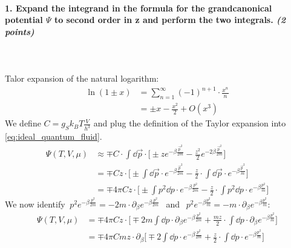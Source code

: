 \paragraph{1. Expand the integrand in the formula for the 
    grandcanonical potential $\Psi$ to second order in z 
    and perform the two integrals. \textit{(2 points)}
} \ \\
    \\
    Talor expansion of the natural logarithm:
    \begin{align}
        \ln(1\pm x)
        &=\sum_{n=1}^\infty(-1)^{n+1}\cdot\frac{x^n}{n} \\
        &=\pm x-\frac{x^2}{2}+O(x^3) 
    \end{align}
    We define $C=g_Sk_BT\frac{V}{h^3}$ and plug the 
    definition of the Taylor expansion into 
    \autoref{eq:ideal_quantum_fluid}.
    \begin{align}
        \Psi(T,V,\mu)
        &\approx\mp C\cdot
        \int\dd\vec p\cdot\bigg[
            \pm ze^{-\beta\frac{\vec p^2}{2m}}
            -\frac{z^2}{2}e^{-2\beta\frac{\vec p^2}{2m}}
        \bigg] \\
        &=\mp Cz\cdot\bigg[
            \pm\int\dd\vec p\cdot
                e^{-\beta\frac{\vec p^2}{2m}}
            -\frac{z}{2}\cdot\int\dd\vec p\cdot
                e^{-\beta\frac{\vec p^2}{m}}
        \bigg] \\
        &=\mp 4\pi Cz\cdot\bigg[
            \pm\int p^2\dd p\cdot
                e^{-\beta\frac{p^2}{2m}}
            -\frac{z}{2}\cdot\int p^2\dd p\cdot
                e^{-\beta\frac{p^2}{m}}
        \bigg]
    \end{align}
    We now identify $\ p^2e^{-\beta\frac{p^2}{2m}}
    =-2m\cdot\partial_\beta e^{-\beta\frac{p^2}{2m}}\ \ $
    and $\ \ p^2e^{-\beta\frac{p^2}{m}}
    =-m\cdot\partial_\beta e^{-\beta\frac{p^2}{m}}$:
    \begin{align}
        \Psi(T,V,\mu)
        &=\mp 4\pi Cz\cdot\bigg[
            \mp2m\int \dd p\cdot\partial_\beta
                e^{-\beta\frac{p^2}{2m}}
            +\frac{mz}{2}\cdot\int \dd p\cdot\partial_\beta
                e^{-\beta\frac{p^2}{m}}
        \bigg] \\
        &=\mp 4\pi Cmz\cdot\partial_\beta\bigg[
            \mp2\int \dd p\cdot
                e^{-\beta\frac{p^2}{2m}}
            +\frac{z}{2}\cdot\int \dd p\cdot
                e^{-\beta\frac{p^2}{m}}
        \bigg]
    \end{align}
